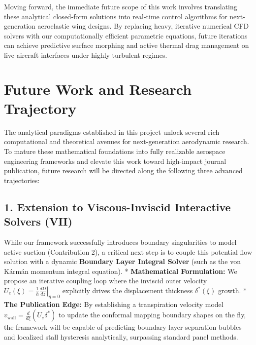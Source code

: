 \documentclass[12pt,a4paper]{article}
\begin{document}
Moving forward, the immediate future scope of this work involves translating these analytical closed-form solutions into real-time control algorithms for next-generation aeroelastic wing designs. By replacing heavy, iterative numerical CFD solvers with our computationally efficient parametric equations, future iterations can achieve predictive surface morphing and active thermal drag management on live aircraft interfaces under highly turbulent regimes.

\section{Future Work and Research Trajectory}

The analytical paradigms established in this project unlock several rich computational and theoretical avenues for next-generation aerodynamic research. To mature these mathematical foundations into fully realizable aerospace engineering frameworks and elevate this work toward high-impact journal publication, future research will be directed along the following three advanced trajectories:

\subsection{1. Extension to Viscous-Inviscid Interactive Solvers (VII)}
While our framework successfully introduces boundary singularities to model active suction (Contribution 2), a critical next step is to couple this potential flow solution with a dynamic \textbf{Boundary Layer Integral Solver} (such as the von Kármán momentum integral equation). 
* \textbf{Mathematical Formulation:} We propose an iterative coupling loop where the inviscid outer velocity $U_e(\xi) = \left. \frac{1}{h} \frac{d\Omega}{dz} \right|_{\eta=0}$ explicitly drives the displacement thickness $\delta^*(\xi)$ growth. 
* \textbf{The Publication Edge:} By establishing a transpiration velocity model $v_{\text{wall}} = \frac{d}{d\xi}(U_e \delta^*)$ to update the conformal mapping boundary shapes on the fly, the framework will be capable of predicting boundary layer separation bubbles and localized stall hysteresis analytically, surpassing standard panel methods.
\end{document}
